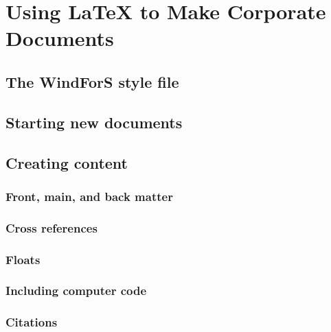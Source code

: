 \chapter{Using LaTeX to Make Corporate Documents }


\section{The WindForS style file}\label{sec:Corporatecls}


\section{Starting new documents}\label{sec:NewDocs}


\section{Creating content}
\subsection{Front, main, and back matter}


\subsection{Cross references}


\subsection{Floats}


\subsection{Including computer code}\label{Sec:Codes}


\subsection{Citations}\label{Sec:Citations}


